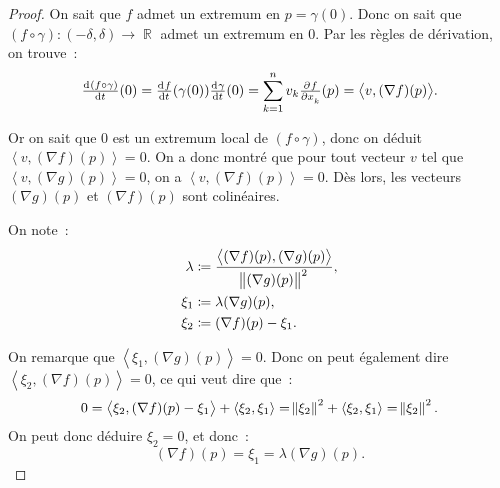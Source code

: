\documentclass{article}
\DeclareMathOperator{\R}{\mathbb R}
\newcommand{\scpr}[2]{{\left\langle#1, #2\right\rangle}}
\theoremstyle{definition}
\theoremstyle{remark}
\begin{document}
\begin{proof}
		On sait que $f$ admet un extremum en $p = \gamma(0)$. Donc on sait que $(f \circ \gamma) : (-\delta, \delta) \to \R$ admet un extremum en 0. Par les
		règles de dérivation, on trouve~:
		\[\od {(f \circ \gamma)}t(0) = \od ft(\gamma(0))\od \gamma t(0) = \sum_{k=1}^nv_k\pd f{x_k}(p) = \scpr v{(\nabla f)(p)}.\]

		Or on sait que $0$ est un extremum local de $(f \circ \gamma)$, donc on déduit $\scpr v{(\nabla f)(p)} = 0$. On a donc montré que pour tout vecteur $v$
		tel que $\scpr v{(\nabla g)(p)} = 0$, on a $\scpr v{(\nabla f)(p)} = 0$. Dès lors, les vecteurs $(\nabla g)(p)$ et $(\nabla f)(p)$ sont colinéaires.

		On note~:
		\begin{align*}
			\lambda &\coloneqq \frac {\scpr {(\nabla f)(p)}{(\nabla g)(p)}}{\norm{(\nabla g)(p)}^2}, \\
			\xi_1 &\coloneqq \lambda (\nabla g)(p), \\
			\xi_2 &\coloneqq (\nabla f)(p) - \xi_1.
		\end{align*}

		On remarque que $\scpr {\xi_1}{(\nabla g)(p)} = 0$. Donc on peut également dire $\scpr {\xi_2}{(\nabla f)(p)} = 0$, ce qui veut dire que~:
		\[0 = \scpr{\xi_2}{(\nabla f)(p) - \xi_1} + \scpr{\xi_2}{\xi_1} = \norm {\xi_2}^2 + \scpr{\xi_2}{\xi_1} = \norm {\xi_2}^2.\]
		On peut donc déduire $\xi_2 = 0$, et donc~:
		\[(\nabla f)(p) = \xi_1 = \lambda (\nabla g)(p).\]
		\end{proof}
\end{document}
